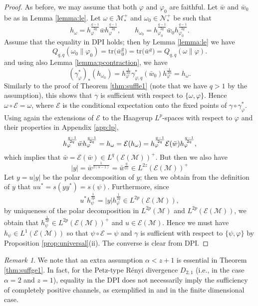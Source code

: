 \documentclass[12pt]{article}
\theoremstyle{definition}
\theoremstyle{remark}
\newtheorem{remark}[theorem]{Remark}
\numberwithin{equation}{section}
\def\cE{\mathcal E}
\def\Me{\mathcal M}
\def\Ne{\mathcal N}
\def\Tr{\mathrm{tr}}
\def\ffi{\varphi}
\begin{document}
\begin{proof} As before, we may assume that both $\ffi$ and $\ffi_0$ are faithful.
Let $\bar w$ and $\bar w_0$ be as in Lemma \ref{lemma:le}. Let $\omega\in
\Me_*^+$ and $\omega_0\in \Ne_*^+$ be such that
\[
h_\omega=h_\ffi^{\frac{q-1}{2q}}\bar wh_\ffi^{\frac{q-1}{2q}},\qquad
h_{\omega_0}=h_{\ffi_0}^{\frac{q-1}{2q}}\bar w_0h_{\ffi_0}^{\frac{q-1}{2q}}.
\]
 Assume that the equality in DPI holds; then by Lemma
\ref{lemma:le} we have
\[
Q_{q,q}(\omega_0\|\varphi_0)=\Tr\bigl(\bar w_0^q\bigr)=\Tr\bigl(\bar
w^q\bigr)=Q_{q,q}(\omega\|\varphi).
\]
and using also Lemma \ref{lemma:pcontraction}, we have
\[
(\gamma^*_\ffi)_*(h_{\omega_0})=h_\ffi^{\frac1{2\alpha}}\gamma^*_{\ffi,q}(\bar
w_0)h_\ffi^{\frac1{2\alpha}}=h_\omega.
\]
Similarly to the proof of Theorem \ref{thm:suffle1} (note that we
have $q>1$ by the assumption), this shows that $\gamma$ is sufficient
with respect to $\{\omega,\ffi\}$. Hence $\omega\circ \cE=\omega$, where $\cE$ is the
conditional expectation onto the fixed points of $\gamma\circ\gamma^*_\ffi$.
Using again the extensions of $\cE$ to the Haagerup $L^p$-spaces with respect to $\ffi$
and their properties in Appendix \ref{app:lp},
\[
h_\varphi^{q-1\over2q}\bar
wh_\varphi^{q-1\over 2q}=h_\omega=\cE(h_\omega)=h_\varphi^{q-1\over 2q}\cE(\bar
w)h_\varphi^{q-1\over 2q},
\]
which implies that $\bar w=\cE(\bar w)\in L^q(\cE(\Me))^+$. But then we also have
\[
|y|=\bar w^{\frac1{2(\alpha-1)}}=\bar w^{\frac{q}{2z}}\in L^{2z}(\cE(\Me))^+
\]
Let $y=u|y|$ be the polar decomposition of $y$; then we obtain from the definition of $y$ that
$uu^*=s(yy^*)=s(\psi)$. Furthermore, since
\[
u^*h_\psi^{\frac1{2p}}=|y|h_\varphi^{\frac1{2q}}\in L^{2p}(\cE(\Me)),
\]
by uniqueness of the polar decomposition in $L^{2p}(\Me)$ and $L^{2p}(\cE(\Me))$, we
obtain that $h_{\psi}^{\frac1{2p}}\in L^{2p}(\cE(\Me))^+$ and $u\in \cE(\Me)$. Hence we must
have $h_\psi\in L^1(\cE(\Me))$ so that $\psi\circ\cE=\psi$ and $\gamma$ is sufficient with
respect to $\{\psi,\ffi\}$ by Proposition \ref{prop:universal}(ii). The converse is clear from DPI.
\end{proof}

\begin{remark}
We note that an extra assumption $\alpha<z+1$ is essential in Theorem \ref{thm:suffge1}.
In fact, for the Petz-type R\'enyi divergence $D_{2,1}$ (i.e., in the case $\alpha=2$ and $z=1$),
equality in the DPI does not necessarily imply the sufficiency of completely positive channels,
as exemplified in \cite[Example 2.2]{jencova2010markov} and \cite[Example 4.8]{hiai2017different}
in the finite dimensional case.
\end{remark}
\end{document}
